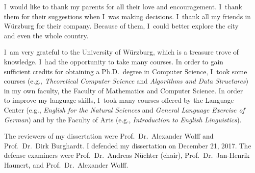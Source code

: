I~would like to thank my parents
for all their love and encouragement.
I~thank them for their suggestions 
when I~was making decisions.
I~thank all my friends in W\"urzburg
for their company.
Because of them, I~could better explore the city 
and even the whole country.

I~am very grateful to the University of W\"urzburg,
which is a treasure trove of knowledge. 
I~had the opportunity to take many courses.
In order to gain sufficient credits for 
obtaining a Ph.D.\ degree in Computer Science,
I~took some courses
(e.g., \emph{Theoretical Computer Science}
and \emph{Algorithms and Data Structures})
in my own faculty, 
the Faculty of Mathematics and Computer Science.
%
In order to improve my language skills,
I~took many courses
offered by the Language Center
(e.g., \emph{English for the Natural Sciences} 
and \emph{General Language Exercise of German})
and by the Faculty of Arts 
(e.g., \emph{Introduction to English Linguistics}).


The reviewers of my dissertation were
Prof.\ Dr.\ Alexander Wolff and Prof.\ Dr.\ Dirk Burghardt.
I defended my dissertation on December 21, 2017.
The defense examiners were Prof.\ Dr.\ Andreas N\"uchter (chair),
Prof.\ Dr.\ Jan-Henrik Haunert, and Prof.\ Dr.\ Alexander Wolff.


